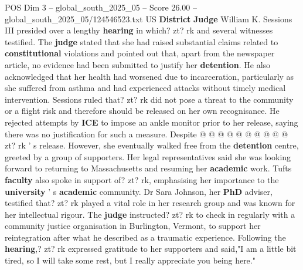 \begin{textsample}{POS Dim 3 – global\_south\_2025\_05 – Score 26.00 – global\_south\_2025\_05/124546523.txt}
US \textbf{District} \textbf{Judge} William K.
Sessions III presided over a lengthy \textbf{hearing} in which? zt? rk and several witnesses testified.
The \textbf{judge} stated that she had raised substantial claims related to \textbf{constitutional} violations and pointed out that, apart from the newspaper article, no evidence had been submitted to justify her \textbf{detention}.
He also acknowledged that her health had worsened due to incarceration, particularly as she suffered from asthma and had experienced attacks without timely medical intervention.
Sessions ruled that? zt? rk did not pose a threat to the community or a flight risk and therefore should be released on her own recognisance.
He rejected attempts by \textbf{ICE} to impose an ankle monitor prior to her release, saying there was no justification for such a measure.
Despite @ @ @ @ @ @ @ @ @ @ zt? rk ' s release.
However, she eventually walked free from the \textbf{detention} centre, greeted by a group of supporters.
Her legal representatives said she was looking forward to returning to Massachusetts and resuming her \textbf{academic} work.
Tufts \textbf{faculty} also spoke in support of? zt? rk, emphasising her importance to the \textbf{university} ' s \textbf{academic} community.
Dr Sara Johnson, her \textbf{PhD} adviser, testified that? zt? rk played a vital role in her research group and was known for her intellectual rigour.
The \textbf{judge} instructed? zt? rk to check in regularly with a community justice organisation in Burlington, Vermont, to support her reintegration after what he described as a traumatic experience.
Following the \textbf{hearing},? zt? rk expressed gratitude to her supporters and said,"I am a little bit tired, so I will take some rest, but I really appreciate you being here."

\end{textsample}
